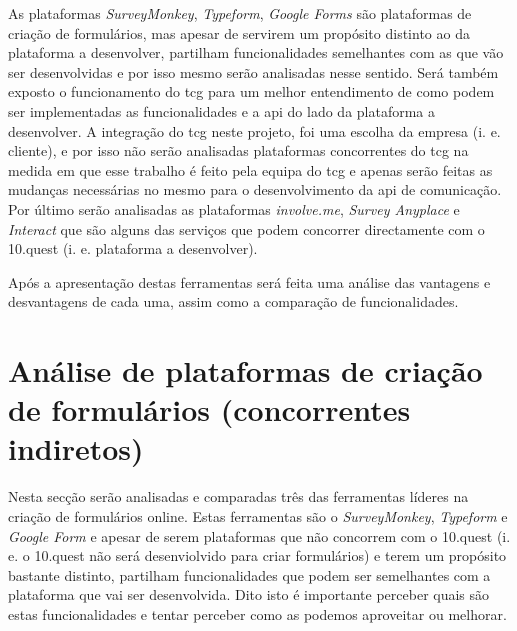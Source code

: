 As plataformas \textit{SurveyMonkey}\cite{surveymonkey}, \textit{Typeform}\cite{typeform}, \textit{Google Forms}\cite{googleform} são plataformas de criação de formulários, mas apesar de servirem um propósito distinto ao da plataforma a desenvolver, partilham funcionalidades semelhantes com as que vão ser desenvolvidas e por isso mesmo serão analisadas nesse sentido. Será também exposto o funcionamento do \acrshort{tcg} para um melhor entendimento de como podem ser implementadas as funcionalidades e a \acrshort{api} do lado da plataforma a desenvolver. A integração do \acrshort{tcg} neste projeto, foi uma escolha da empresa (i. e. cliente), e por isso não serão analisadas plataformas concorrentes do \acrshort{tcg} na medida em que esse trabalho é feito pela equipa do \acrshort{tcg} e apenas serão feitas as mudanças necessárias no mesmo para o desenvolvimento da \acrshort{api} de comunicação. Por último serão analisadas as plataformas \textit{involve.me}\cite{involve}, \textit{Survey Anyplace}\cite{surveyA} e \textit{Interact}\cite{interact} que são alguns das serviços que podem concorrer directamente com o 10.quest (i. e. plataforma a desenvolver).

Após a apresentação destas ferramentas será feita uma análise das vantagens e desvantagens de cada uma, assim como a comparação de funcionalidades.

\section{Análise de plataformas de criação de formulários (concorrentes indiretos)}
\label{formulários}

Nesta secção serão analisadas e comparadas três das ferramentas líderes na criação de formulários online. Estas ferramentas são o \textit{SurveyMonkey}, \textit{Typeform} e \textit{Google Form} e apesar de serem plataformas que não concorrem com o 10.quest (i. e. o 10.quest não será desenviolvido para criar formulários) e terem um propósito bastante distinto, partilham funcionalidades que podem ser semelhantes com a plataforma que vai ser desenvolvida. Dito isto é importante perceber quais são estas funcionalidades e tentar perceber como as podemos aproveitar ou melhorar.


